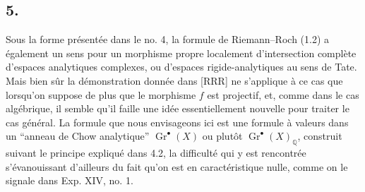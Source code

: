 \documentclass[11pt]{article}
\newcommand{\Gr}{\operatorname{Gr}}
\begin{document}
\subsection*{5.}
Sous la forme pr\'esent\'ee dans le no. 4, la formule de Riemann--Roch (1.2) a \'egalement un sens pour un morphisme propre localement d'intersection compl\`ete d'espaces analytiques complexes, ou d'espaces rigide-analytiques au sens de Tate. Mais bien s\^ur la d\'emonstration donn\'ee dans [RRR] ne s'applique \`a ce cas que lorsqu'on suppose de plus que le morphisme $f$ est projectif, et, comme dans le cas alg\'ebrique, il semble qu'il faille une id\'ee essentiellement nouvelle pour traiter le cas g\'en\'eral. La formule que nous envisageons ici est une formule \`a valeurs dans un ``anneau de Chow analytique'' $\Gr^\bullet(X)$ ou plut\^ot $\Gr^\bullet(X)_{\mathbb Q}$, construit suivant le principe expliqu\'e dans 4.2, la difficult\'e qui y est rencontr\'ee s'\'evanouissant d'ailleurs du fait qu'on est en caract\'eristique nulle, comme on le signale dans Exp. XIV, no. 1.
\end{document}
